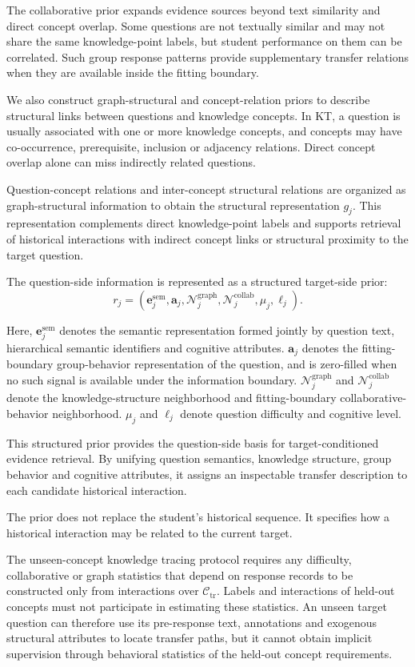 \documentclass[a4paper,12pt]{article}
\numberwithin{table}{section}
\begin{document}
The collaborative prior expands evidence sources beyond text similarity and direct concept overlap. Some questions are not textually similar and may not share the same knowledge-point labels, but student performance on them can be correlated. Such group response patterns provide supplementary transfer relations when they are available inside the fitting boundary.

We also construct graph-structural and concept-relation priors to describe structural links between questions and knowledge concepts. In KT, a question is usually associated with one or more knowledge concepts, and concepts may have co-occurrence, prerequisite, inclusion or adjacency relations. Direct concept overlap alone can miss indirectly related questions.

Question-concept relations and inter-concept structural relations are organized as graph-structural information to obtain the structural representation \(g_j\). This representation complements direct knowledge-point labels and supports retrieval of historical interactions with indirect concept links or structural proximity to the target question.

The question-side information is represented as a structured target-side prior:
\[
r_j=\left(\mathbf e_j^{\mathrm{sem}},\mathbf a_j,\mathcal N_j^{\mathrm{graph}},\mathcal N_j^{\mathrm{collab}},\mu_j,\ell_j\right).
\]

Here, \(\mathbf e_j^{\mathrm{sem}}\) denotes the semantic representation formed jointly by question text, hierarchical semantic identifiers and cognitive attributes. \(\mathbf a_j\) denotes the fitting-boundary group-behavior representation of the question, and is zero-filled when no such signal is available under the information boundary. \(\mathcal N_j^{\mathrm{graph}}\) and \(\mathcal N_j^{\mathrm{collab}}\) denote the knowledge-structure neighborhood and fitting-boundary collaborative-behavior neighborhood. \(\mu_j\) and \(\ell_j\) denote question difficulty and cognitive level.

This structured prior provides the question-side basis for target-conditioned evidence retrieval. By unifying question semantics, knowledge structure, group behavior and cognitive attributes, it assigns an inspectable transfer description to each candidate historical interaction.

The prior does not replace the student's historical sequence. It specifies how a historical interaction may be related to the current target.

The unseen-concept knowledge tracing protocol requires any difficulty, collaborative or graph statistics that depend on response records to be constructed only from interactions over \(\mathcal{C}_{\mathrm{tr}}\). Labels and interactions of held-out concepts must not participate in estimating these statistics. An unseen target question can therefore use its pre-response text, annotations and exogenous structural attributes to locate transfer paths, but it cannot obtain implicit supervision through behavioral statistics of the held-out concept requirements.
\end{document}
